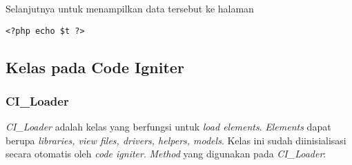 Selanjutnya untuk menampilkan data tersebut ke halaman
 
\begin{lstlisting}
<?php echo $t ?>
\end{lstlisting}

\subsection{Kelas pada Code Igniter}
\subsubsection{CI\_Loader}
\textit{CI\_Loader} adalah kelas yang berfungsi untuk \textit{load elements}. \textit{Elements} dapat berupa \textit{libraries, view files, drivers, helpers, models}. Kelas ini sudah diinisialisasi secara otomatis oleh \textit{code igniter}. \textit{Method} yang digunakan pada \textit{CI\_Loader}:

